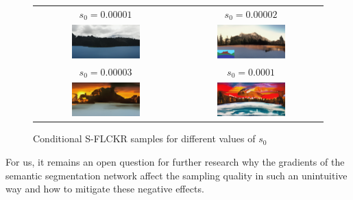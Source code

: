 \begin{figure}[] \label{fig:5.17}
    \setlength\tabcolsep{1pt}
    \centering
    \begin{tabular}{cc}
        $s_0=0.00001$ & $s_0=0.00002$\\ 
        \includegraphics[width=0.5\textwidth]{Chapters/figures/experiments/flickr/4_sample.png} &
        \includegraphics[width=0.5\textwidth]{Chapters/figures/experiments/flickr/flickr_sample_1.PNG} \\
         $s_0=0.00003$ & $s_0=0.0001$ \\
        \includegraphics[width=0.5\textwidth]{Chapters/figures/experiments/flickr/2_sample.png} &
        \includegraphics[width=0.5\textwidth]{Chapters/figures/experiments/flickr/1_sample.png}
    \end{tabular}
    \caption{Conditional S-FLCKR samples for different values of $s_0$}
\end{figure}

For us, it remains an open question for further research why the gradients of the semantic segmentation network affect the sampling quality in such an unintuitive way and how to mitigate these negative effects.

